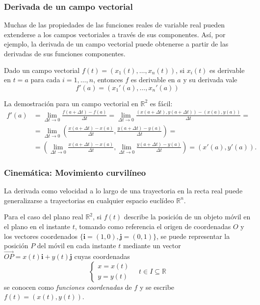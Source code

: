 \begin{frame}
	\frametitle{Derivada de un campo vectorial}
	Muchas de las propiedades de las funciones reales de variable real pueden extenderse a los campos vectoriales a través de sus componentes. 
	Así, por ejemplo, la derivada de un campo vectorial puede obtenerse a partir de las derivadas de sus funciones componentes.
	
	\begin{teorema}
		Dado un campo vectorial $f(t)=(x_1(t),\ldots,x_n(t))$, si $x_i(t)$ es derivable en $t=a$ para cada $i=1,\ldots,n$, entonces $f$ es derivable en $a$ y su derivada vale
		\[
			f'(a)=(x_1'(a),\ldots,x_n'(a))
		\]
	\end{teorema}
	
	La demostración para un campo vectorial en $\mathbb{R}^2$ es fácil:
	\begin{align*}
		f'(a) & =\lim_{\Delta t\rightarrow 0} \frac{f(a+\Delta t)-f(a)}{\Delta t} = \lim_{\Delta t\rightarrow 0} \frac{(x(a+\Delta t),y(a+\Delta t))-(x(a),y(a))}{\Delta t} = \\
		      & =  \lim_{\Delta t\rightarrow 0} \left(\frac{x(a+\Delta t)-x(a)}{\Delta t},\frac{y(a+\Delta t)-y(a)}{\Delta t}\right) =                                        \\
		      & = \left(\lim_{\Delta t\rightarrow 0}\frac{x(a+\Delta t)-x(a)}{\Delta t},\lim_{\Delta t\rightarrow 0}\frac{y(a+\Delta t)-y(a)}{\Delta t}\right) =              
		(x'(a),y'(a)).
	\end{align*}
\end{frame}


\begin{frame}
	\frametitle{Cinemática: Movimiento curvilíneo}
	La derivada como velocidad a lo largo de una trayectoria en la recta real puede generalizarse a trayectorias en cualquier
	espacio euclídeo $\mathbb{R}^n$.
	
	Para el caso del plano real $\mathbb{R}^2$, si $f(t)$ describe la posición de un objeto móvil en el plano en el instante
	$t$, tomando como referencia el origen de coordenadas $O$ y los vectores coordenados
	$\{\mathbf{i}=(1,0),\mathbf{j}=(0,1)\}$, se puede representar la posición $P$ del móvil en cada instante $t$ mediante un
	vector $\vec{OP}=x(t)\mathbf{i}+y(t)\mathbf{j}$ cuyas coordenadas
	\[
		\begin{cases}
			x=x(t) \\
			y=y(t) 
		\end{cases}
		\quad
		t\in I\subseteq \mathbb{R}
	\]
	se conocen como \emph{funciones coordenadas} de $f$ y se escribe $f(t)=(x(t),y(t))$.
	
	\begin{center}
		\scalebox{0.8}{}
	\end{center}
\end{frame}


